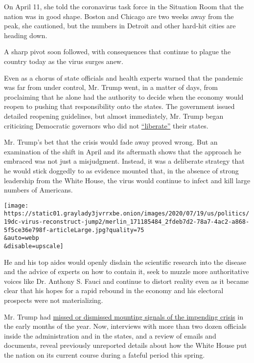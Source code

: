 On April 11, she told the coronavirus task force in the Situation Room
that the nation was in good shape. Boston and Chicago are two weeks away
from the peak, she cautioned, but the numbers in Detroit and other
hard-hit cities are heading down.

A sharp pivot soon followed, with consequences that continue to plague
the country today as the virus surges anew.

Even as a chorus of state officials and health experts warned that the
pandemic was far from under control, Mr. Trump went, in a matter of
days, from proclaiming that he alone had the authority to decide when
the economy would reopen to pushing that responsibility onto the states.
The government issued detailed reopening guidelines, but almost
immediately, Mr. Trump began criticizing Democratic governors who did
not
\href{https://twitter.com/realDonaldTrump/status/1251169217531056130?s=20}{``liberate''}
their states.

Mr. Trump's bet that the crisis would fade away proved wrong. But an
examination of the shift in April and its aftermath shows that the
approach he embraced was not just a misjudgment. Instead, it was a
deliberate strategy that he would stick doggedly to as evidence mounted
that, in the absence of strong leadership from the White House, the
virus would continue to infect and kill large numbers of Americans.

\texttt{[image: https://static01.graylady3jvrrxbe.onion/images/2020/07/19/us/politics/19dc-virus-reconstruct-jump2/merlin\_171185484\_2fdeb7d2-78a7-4ac2-a868-5f5ce36e798f-articleLarge.jpg?quality=75\\\&auto=webp\\\&disable=upscale]}

He and his top aides would openly disdain the scientific research into
the disease and the advice of experts on how to contain it, seek to
muzzle more authoritative voices like Dr. Anthony S. Fauci and continue
to distort reality even as it became clear that his hopes for a rapid
rebound in the economy and his electoral prospects were not
materializing.

Mr. Trump had
\href{https://www.nytimes3xbfgragh.onion/2020/04/11/us/politics/coronavirus-trump-response.html}{missed
or dismissed mounting signals of the impending crisis} in the early
months of the year. Now, interviews with more than two dozen officials
inside the administration and in the states, and a review of emails and
documents, reveal previously unreported details about how the White
House put the nation on its current course during a fateful period this
spring.

